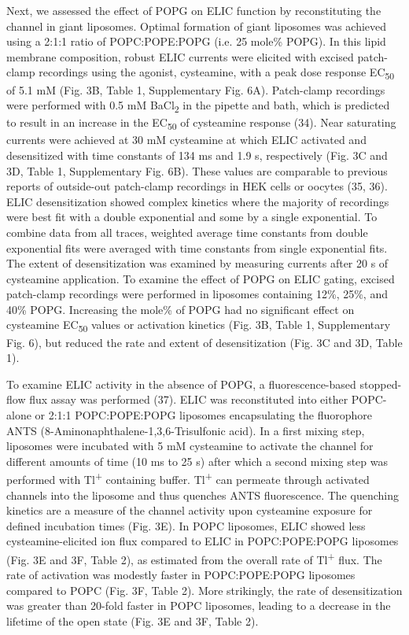 Next, we assessed the effect of POPG on ELIC function by reconstituting
the channel in giant liposomes. Optimal formation of giant liposomes was
achieved using a 2:1:1 ratio of POPC:POPE:POPG (i.e. 25 mole\% POPG). In
this lipid membrane composition, robust ELIC currents were elicited with
excised patch-clamp recordings using the agonist, cysteamine, with a
peak dose response EC\textsubscript{50} of 5.1 mM (Fig. 3B, Table 1,
Supplementary Fig. 6A). Patch-clamp recordings were performed with 0.5
mM BaCl\textsubscript{2} in the pipette and bath, which is predicted to
result in an increase in the EC\textsubscript{50} of cysteamine response
(34). Near saturating currents were achieved at 30 mM cysteamine at
which ELIC activated and desensitized with time constants of 134 ms and
1.9 s, respectively (Fig. 3C and 3D, Table 1, Supplementary Fig. 6B).
These values are comparable to previous reports of outside-out
patch-clamp recordings in HEK cells or oocytes (35, 36). ELIC
desensitization showed complex kinetics where the majority of recordings
were best fit with a double exponential and some by a single
exponential. To combine data from all traces, weighted average time
constants from double exponential fits were averaged with time constants
from single exponential fits. The extent of desensitization was examined
by measuring currents after 20 s of cysteamine application. To examine
the effect of POPG on ELIC gating, excised patch-clamp recordings were
performed in liposomes containing 12\%, 25\%, and 40\% POPG. Increasing
the mole\% of POPG had no significant effect on cysteamine
EC\textsubscript{50} values or activation kinetics (Fig. 3B, Table 1,
Supplementary Fig. 6), but reduced the rate and extent of
desensitization (Fig. 3C and 3D, Table 1).

To examine ELIC activity in the absence of POPG, a fluorescence-based
stopped-flow flux assay was performed (37). ELIC was reconstituted into
either POPC-alone or 2:1:1 POPC:POPE:POPG liposomes encapsulating the
fluorophore ANTS (8-Aminonaphthalene-1,3,6-Trisulfonic acid). In a first
mixing step, liposomes were incubated with 5 mM cysteamine to activate
the channel for different amounts of time (10 ms to 25 s) after which a
second mixing step was performed with Tl\textsuperscript{+} containing
buffer. Tl\textsuperscript{+} can permeate through activated channels
into the liposome and thus quenches ANTS fluorescence. The quenching
kinetics are a measure of the channel activity upon cysteamine exposure
for defined incubation times (Fig. 3E). In POPC liposomes, ELIC showed
less cysteamine-elicited ion flux compared to ELIC in POPC:POPE:POPG
liposomes (Fig. 3E and 3F, Table 2), as estimated from the overall rate
of Tl\textsuperscript{+} flux. The rate of activation was modestly
faster in POPC:POPE:POPG liposomes compared to POPC (Fig. 3F, Table 2).
More strikingly, the rate of desensitization was greater than 20-fold
faster in POPC liposomes, leading to a decrease in the lifetime of the
open state (Fig. 3E and 3F, Table 2).

